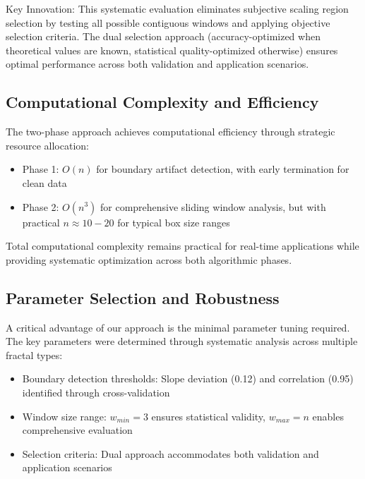 \documentclass[preprint,12pt]{elsarticle}
\def\textbf#1{#1}%
\begin{document}
\textbf{Key Innovation}: This systematic evaluation eliminates subjective scaling region selection by testing all possible contiguous windows and applying objective selection criteria. The dual selection approach (accuracy-optimized when theoretical values are known, statistical quality-optimized otherwise) ensures optimal performance across both validation and application scenarios.

\subsection{Computational Complexity and Efficiency}

The two-phase approach achieves computational efficiency through strategic resource allocation:

\begin{itemize}
\item \textbf{Phase 1}: $O(n)$ for boundary artifact detection, with early termination for clean data

\item \textbf{Phase 2}: $O(n^3)$ for comprehensive sliding window analysis, but with practical $n \approx 10-20$ for typical box size ranges
\end{itemize}

Total computational complexity remains practical for real-time applications while providing systematic optimization across both algorithmic phases.

\subsection{Parameter Selection and Robustness}

A critical advantage of our approach is the minimal parameter tuning required. The key parameters were determined through systematic analysis across multiple fractal types:

\begin{itemize}
\item \textbf{Boundary detection thresholds}: Slope deviation (0.12) and correlation (0.95) identified through cross-validation
\item \textbf{Window size range}: $w_{min} = 3$ ensures statistical validity, $w_{max} = n$ enables comprehensive evaluation
\item \textbf{Selection criteria}: Dual approach accommodates both validation and application scenarios
\end{itemize}
\end{document}
